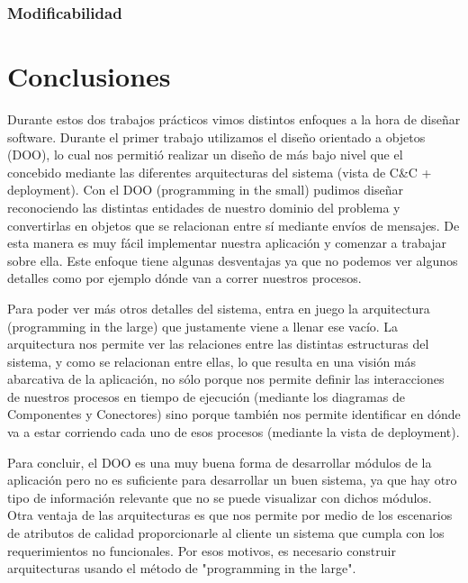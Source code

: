 \documentclass{article}
\theoremstyle{definition}
\theoremstyle{remark}
\begin{document}
\subsubsection{Modificabilidad}

\pagebreak

\section{Conclusiones}

Durante estos dos trabajos prácticos vimos distintos enfoques a la hora de diseñar software. Durante el primer trabajo utilizamos el diseño orientado a objetos (DOO), lo cual nos permitió realizar un diseño de más bajo nivel que el concebido mediante las diferentes arquitecturas del sistema (vista de C\&C + deployment). Con el DOO (programming in the small) pudimos diseñar reconociendo las distintas entidades de nuestro dominio del problema y convertirlas en objetos que se relacionan entre sí mediante envíos de mensajes. De esta manera es muy fácil implementar nuestra aplicación y comenzar a trabajar sobre ella. Este enfoque tiene algunas desventajas ya que no podemos ver algunos detalles como por ejemplo dónde van a correr nuestros procesos.

Para poder ver más otros detalles del sistema, entra en juego la arquitectura (programming in the large) que justamente viene a llenar ese vacío. La arquitectura nos permite ver las relaciones entre las distintas estructuras del sistema, y como se relacionan entre ellas, lo que resulta en una visión más abarcativa de la aplicación, no sólo porque nos permite definir las interacciones de nuestros procesos en tiempo de ejecución (mediante los diagramas de Componentes y Conectores) sino porque también nos permite identificar en dónde va a estar corriendo cada uno de esos procesos (mediante la vista de deployment).

Para concluir, el DOO es una muy buena forma de desarrollar módulos de la aplicación pero no es suficiente para desarrollar un buen sistema, ya que hay otro tipo de información relevante que no se puede visualizar con dichos módulos. Otra ventaja de las arquitecturas es que nos permite por medio de los escenarios de atributos de calidad proporcionarle al cliente un sistema que cumpla con los requerimientos no funcionales. Por esos motivos, es necesario construir arquitecturas usando el método de "programming in the large".
\end{document}
